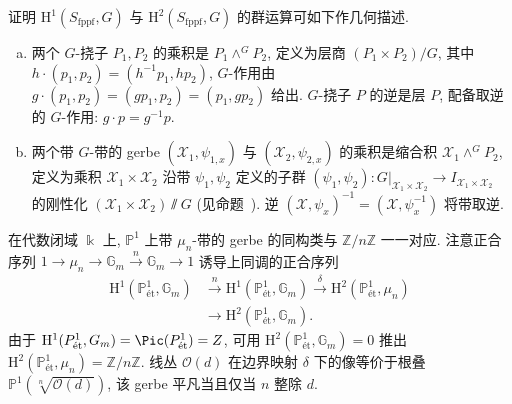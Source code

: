 \begin{exercise}[群结构]\label{src:7.4.46}
证明 $\mathrm H^1(S_{\mathrm{fppf}},G)$ 与 $\mathrm H^2(S_{\mathrm{fppf}},G)$ 的群运算可如下作几何描述.
\begin{enumerate}[(a)]
\item 两个 $G$-挠子 $P_1,P_2$ 的乘积是 $P_1\wedge^G P_2$, 定义为层商 $(P_1\times P_2)/G$, 其中 $h\cdot(p_1,p_2)=(h^{-1}p_1,hp_2)$, $G$-作用由 $g\cdot(p_1,p_2)=(gp_1,p_2)=(p_1,gp_2)$ 给出. $G$-挠子 $P$ 的逆是层 $P$, 配备取逆的 $G$-作用: $g\cdot p=g^{-1}p$.
\item 两个带 $G$-带的 gerbe $(\mathcal X_1,\psi_{1,x})$ 与 $(\mathcal X_2,\psi_{2,x})$ 的乘积是缩合积 $\mathcal X_1\wedge^G P_2$, 定义为乘积 $\mathcal X_1\times\mathcal X_2$ 沿带 $\psi_1,\psi_2$ 定义的子群 $(\psi_1,\psi_2):G|_{\mathcal X_1\times\mathcal X_2}\to I_{\mathcal X_1\times\mathcal X_2}$ 的刚性化 $(\mathcal X_1\times\mathcal X_2)\!\sslash G$ (见命题~). 逆 $(\mathcal X,\psi_x)^{-1}=(\mathcal X,\psi_x^{-1})$ 将带取逆.
\end{enumerate}
\end{exercise}
\begin{remark}\label{src:7.4.47}
在代数闭域 $\Bbbk$ 上, $\mathbb P^1$ 上带 $\mu_n$-带的 gerbe 的同构类与 $\mathbb Z/n\mathbb Z$ 一一对应. 注意正合序列 $1\to\mu_n\to\mathbb G_m\xrightarrow{n}\mathbb G_m\to1$ 诱导上同调的正合序列
\[
\begin{aligned}
\mathrm H^1(\mathbb P^1_{\text{ét}},\mathbb G_m)&\xrightarrow{n}\mathrm H^1(\mathbb P^1_{\text{ét}},\mathbb G_m)\xrightarrow{\delta}\mathrm H^2(\mathbb P^1_{\text{ét}},\mu_n)\\
&\longrightarrow\mathrm H^2(\mathbb P^1_{\text{ét}},\mathbb G_m).
\end{aligned}
\]
由于 $\mathrm H^1(\mathbb P^1_{\text{ét}},\mathbb G_m)=\Pic(\mathbb P^1_{\text{ét}})=\mathbb Z$, 可用 $\mathrm H^2(\mathbb P^1_{\text{ét}},\mathbb G_m)=0$ 推出 $\mathrm H^2(\mathbb P^1_{\text{ét}},\mu_n)=\mathbb Z/n\mathbb Z$. 线丛 $\mathcal O(d)$ 在边界映射 $\delta$ 下的像等价于根叠 $\mathbb P^1(\sqrt[n]{\mathcal O(d)})$, 该 gerbe 平凡当且仅当 $n$ 整除 $d$.
\end{remark}
